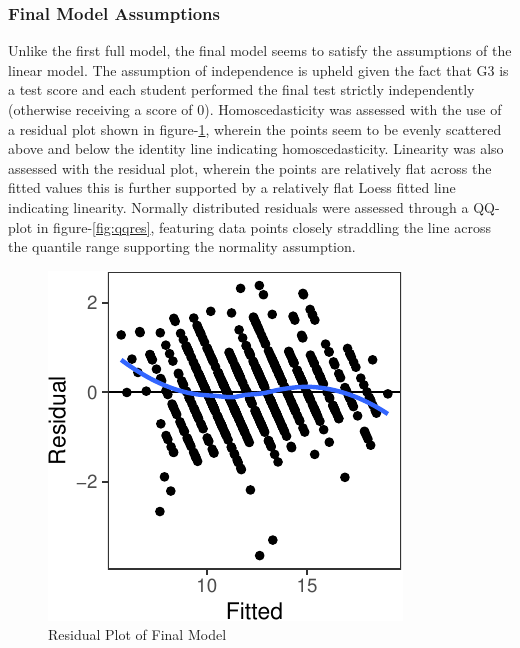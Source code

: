 \documentclass[a4paper,8pt,twocolumn,twoside,]{pinp}
\begin{document}
\hypertarget{final-model-assumptions}{%
\subsubsection{Final Model Assumptions}\label{final-model-assumptions}}

Unlike the first full model, the final model seems to satisfy the
assumptions of the linear model. The assumption of independence is
upheld given the fact that G3 is a test score and each student performed
the final test strictly independently (otherwise receiving a score of
0). Homoscedasticity was assessed with the use of a residual plot shown
in figure-\ref{fig:finres}, wherein the points seem to be evenly
scattered above and below the identity line indicating homoscedasticity.
Linearity was also assessed with the residual plot, wherein the points
are relatively flat across the fitted values this is further supported
by a relatively flat Loess fitted line indicating linearity. Normally
distributed residuals were assessed through a QQ-plot in
figure-\ref{fig:qqres}, featuring data points closely straddling the
line across the quantile range supporting the normality assumption.

\begin{figure}

{\centering \includegraphics{CC05E4-FinalReport_files/figure-latex/finres-1} 

}

\caption{Residual Plot of Final Model}\label{fig:finres}
\end{figure}
\end{document}
